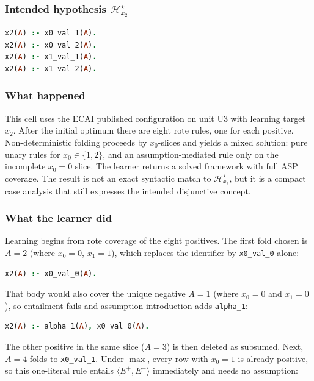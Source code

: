 \documentclass[11pt]{article}
\begin{document}
\subsubsection{\texorpdfstring{Intended hypothesis \(\mathcal{H}_{x_2}^\star\)}{Intended hypothesis H-star(x2)}}

\begin{lstlisting}[style=logic,language=Prolog]
x2(A) :- x0_val_1(A).
x2(A) :- x0_val_2(A).
x2(A) :- x1_val_1(A).
x2(A) :- x1_val_2(A).
\end{lstlisting}

\subsubsection{What happened}

This cell uses the ECAI published configuration on unit U3 with learning target \(x_2\). After the initial optimum there are eight rote rules, one for each positive. Non-deterministic folding proceeds by \(x_0\)-slices and yields a mixed solution: pure unary rules for \(x_0\in\{1,2\}\), and an assumption-mediated rule only on the incomplete \(x_0=0\) slice. The learner returns a solved framework with full ASP coverage. The result is not an exact syntactic match to \(\mathcal{H}_{x_2}^\star\), but it is a compact case analysis that still expresses the intended disjunctive concept.

\subsubsection{What the learner did}

Learning begins from rote coverage of the eight positives. The first fold chosen is \(A=2\) (where \(x_0=0\), \(x_1=1\)), which replaces the identifier by \texttt{x0\_val\_0} alone:

\begin{lstlisting}[style=logic,language=Prolog]
x2(A) :- x0_val_0(A).
\end{lstlisting}

That body would also cover the unique negative \(A=1\) (where \(x_0=0\) and \(x_1=0\)), so entailment fails and assumption introduction adds \texttt{alpha\_1}:

\begin{lstlisting}[style=logic,language=Prolog]
x2(A) :- alpha_1(A), x0_val_0(A).
\end{lstlisting}

The other positive in the same slice (\(A=3\)) is then deleted as subsumed. Next, \(A=4\) folds to \texttt{x0\_val\_1}. Under \(\max\), every row with \(x_0=1\) is already positive, so this one-literal rule entails \(\langle E^+,E^-\rangle\) immediately and needs no assumption:
\end{document}
